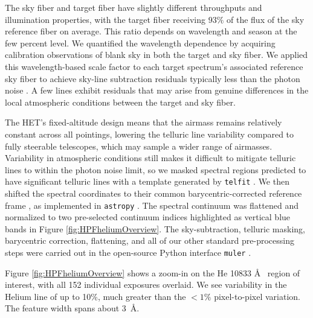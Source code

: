 \documentclass[linenumbers, twocolumn, trackchanges]{aastex631}
\begin{document}
The sky fiber and target fiber have slightly different throughputs and illumination properties, with the target fiber receiving $93\%$ of the flux of the sky reference fiber on average.  This ratio depends on wavelength and season at the few percent level.  We quantified the wavelength dependence by acquiring calibration observations of blank sky in both the target and sky fiber.  We applied this wavelength-based scale factor to each target spectrum's associated reference sky fiber to achieve sky-line subtraction residuals typically less than the photon noise \citep{2022JOSS....7.4302G}.  A few lines exhibit residuals that may arise from genuine differences in the local atmospheric conditions between the target and sky fiber.

The HET's fixed-altitude design means that the airmass remains relatively constant across all pointings, lowering the telluric line variability compared to fully steerable telescopes, which may sample a wider range of airmasses.  Variability in atmospheric conditions still makes it difficult to mitigate telluric lines to within the photon noise limit, so we masked spectral regions predicted to have significant telluric lines with a template generated by \texttt{telfit} \citep{2014AJ....148...53G}.  We then shifted the spectral coordinates to their common barycentric-corrected reference frame \citep{2014PASP..126..838W}, as implemented in \texttt{astropy} \citep{2013A&A...558A..33A,2018AJ....156..123A,2022ApJ...935..167A}.  The spectral continuum was flattened and normalized to two pre-selected continuum indices highlighted as vertical blue bands in Figure \ref{fig:HPFheliumOverview}.  The sky-subtraction, telluric masking, barycentric correction, flattening, and all of our other standard pre-processing steps were carried out in the open-source Python interface \texttt{muler} \citep{2022JOSS....7.4302G}.

Figure \ref{fig:HPFheliumOverview} shows a zoom-in on the He 10833 \AA~ region of interest, with all 152 individual exposures overlaid.  We see variability in the Helium line of up to 10\%, much greater than the $<1\%$ pixel-to-pixel variation.  The feature width spans about 3~\AA.
\end{document}
